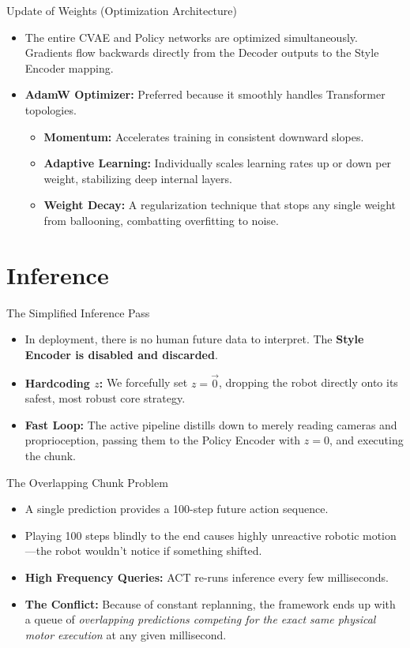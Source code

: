 \documentclass[11pt, aspectratio=169]{beamer}
\begin{document}
\begin{frame}{Update of Weights (Optimization Architecture)}
    \begin{itemize}
        \item The entire CVAE and Policy networks are optimized simultaneously. Gradients flow backwards directly from the Decoder outputs to the Style Encoder mapping.
        \item \textbf{AdamW Optimizer:} Preferred because it smoothly handles Transformer topologies.
        \begin{itemize}
            \item \textbf{Momentum:} Accelerates training in consistent downward slopes.
            \item \textbf{Adaptive Learning:} Individually scales learning rates up or down per weight, stabilizing deep internal layers.
            \item \textbf{Weight Decay:} A regularization technique that stops any single weight from ballooning, combatting overfitting to noise.
        \end{itemize}
    \end{itemize}
\end{frame}

\section{Inference}

\begin{frame}{The Simplified Inference Pass}
    \begin{itemize}
        \item In deployment, there is no human future data to interpret. The \textbf{Style Encoder is disabled and discarded}.
        \item \textbf{Hardcoding $z$:} We forcefully set $z = \vec{0}$, dropping the robot directly onto its safest, most robust core strategy.
        \item \textbf{Fast Loop:} The active pipeline distills down to merely reading cameras and proprioception, passing them to the Policy Encoder with $z=0$, and executing the chunk.
    \end{itemize}
\end{frame}

\begin{frame}{The Overlapping Chunk Problem}
    \begin{itemize}
        \item A single prediction provides a 100-step future action sequence.
        \item Playing 100 steps blindly to the end causes highly unreactive robotic motion---the robot wouldn't notice if something shifted.
        \item \textbf{High Frequency Queries:} ACT re-runs inference every few milliseconds.
        \item \textbf{The Conflict:} Because of constant replanning, the framework ends up with a queue of \textit{overlapping predictions competing for the exact same physical motor execution} at any given millisecond.
    \end{itemize}
\end{frame}
\end{document}
